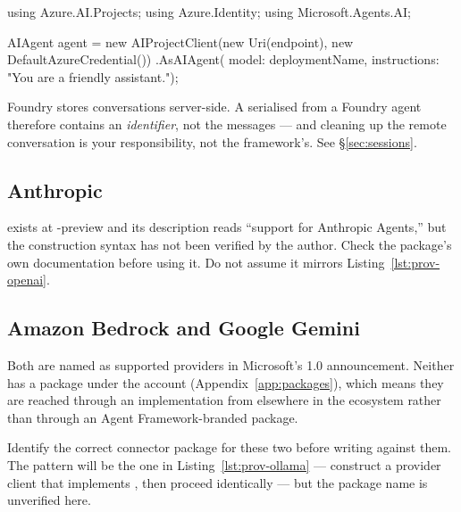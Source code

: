 \begin{csharp}[caption={Foundry Agents}, label={lst:prov-foundry}]
using Azure.AI.Projects;
using Azure.Identity;
using Microsoft.Agents.AI;

AIAgent agent = new AIProjectClient(new Uri(endpoint), new DefaultAzureCredential())
    .AsAIAgent(
        model: deploymentName,
        instructions: "You are a friendly assistant.");
\end{csharp}

\begin{warning}
Foundry stores conversations server-side. A serialised  from a
Foundry agent therefore contains an \emph{identifier}, not the messages --- and
cleaning up the remote conversation is your responsibility, not the framework's.
See \S\ref{sec:sessions}.
\end{warning}

\subsection{Anthropic}

\begin{verifybox}
 exists at \mafcore{}-preview and its
description reads ``support for Anthropic Agents,'' but the construction syntax
has not been verified by the author. Check the package's own documentation before
using it. Do not assume it mirrors Listing~\ref{lst:prov-openai}.
\end{verifybox}

\subsection{Amazon Bedrock and Google Gemini}

Both are named as supported providers in Microsoft's 1.0 announcement. Neither
has a package under the  account
(Appendix~\ref{app:packages}), which means they are reached through an
 implementation from elsewhere in the
 ecosystem rather than through an Agent
Framework-branded package.

\begin{verifybox}
Identify the correct connector package for these two before writing against them.
The pattern will be the one in Listing~\ref{lst:prov-ollama} --- construct a
provider client that implements , then proceed identically ---
but the package name is unverified here.
\end{verifybox}

